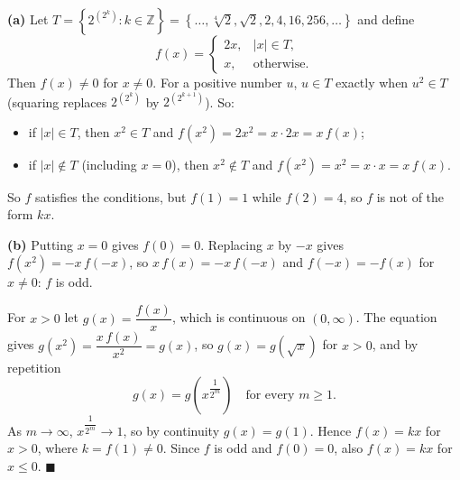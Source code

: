 \textbf{(a)} Let $T=\left\{2^{\left(2^k\right)}:k\in\mathbb{Z}\right\}=\left\{\dots,\sqrt[4]{2},\sqrt2,2,4,16,256,\dots\right\}$ and define
\[f(x)=\begin{cases}2x,&|x|\in T,\\ x,&\text{otherwise.}\end{cases}\]
Then $f(x)\ne0$ for $x\ne0$. For a positive number $u$, $u\in T$ exactly when $u^2\in T$ (squaring replaces $2^{\left(2^k\right)}$ by $2^{\left(2^{k+1}\right)}$). So:
\begin{itemize}
\item if $|x|\in T$, then $x^2\in T$ and $f\left(x^2\right)=2x^2=x\cdot2x=x\,f(x)$;
\item if $|x|\notin T$ (including $x=0$), then $x^2\notin T$ and $f\left(x^2\right)=x^2=x\cdot x=x\,f(x)$.
\end{itemize}
So $f$ satisfies the conditions, but $f(1)=1$ while $f(2)=4$, so $f$ is not of the form $kx$.

\textbf{(b)} Putting $x=0$ gives $f(0)=0$. Replacing $x$ by $-x$ gives $f\left(x^2\right)=-x\,f(-x)$, so $x\,f(x)=-x\,f(-x)$ and $f(-x)=-f(x)$ for $x\ne0$: $f$ is odd.

For $x>0$ let $g(x)=\dfrac{f(x)}{x}$, which is continuous on $(0,\infty)$. The equation gives $g\left(x^2\right)=\dfrac{x\,f(x)}{x^2}=g(x)$, so $g(x)=g\left(\sqrt x\right)$ for $x>0$, and by repetition
\[g(x)=g\left(x^{\dfrac{1}{2^m}}\right)\quad\text{for every }m\ge1.\]
As $m\to\infty$, $x^{\dfrac{1}{2^m}}\to1$, so by continuity $g(x)=g(1)$. Hence $f(x)=kx$ for $x>0$, where $k=f(1)\ne0$. Since $f$ is odd and $f(0)=0$, also $f(x)=kx$ for $x\le0$. $\blacksquare$
